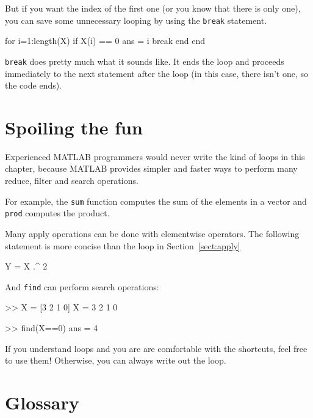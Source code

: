 \documentclass[
]{book}
\numberwithin{Answer}{chapter}
\numberwithin{Exercise}{chapter}
\begin{document}
But if you want the index of the first one (or you know that there
is only one), you can save some unnecessary looping by using the
{\tt break} statement.


\begin{code}
for i=1:length(X)
    if X(i) == 0
        ans = i
        break
    end
end
\end{code}

{\tt break} does pretty much what it sounds like.  It ends the
loop and proceeds immediately to the next statement after the
loop (in this case, there isn't one, so the code ends).


\section{Spoiling the fun}

Experienced MATLAB programmers would never write the kind of loops
in this chapter, because MATLAB provides simpler and faster ways to
perform many reduce, filter and search operations.

For example, the {\tt sum} function computes the sum of the elements
in a vector and {\tt prod} computes the product.

Many apply operations can be done with elementwise operators.
The following statement is more concise than the loop in
Section~\ref{sect:apply}

\begin{code}
Y = X .^ 2
\end{code}

And {\tt find} can perform search operations:

\begin{code}
>> X = [3 2 1 0]
X = 3     2     1     0

>> find(X==0)
ans = 4
\end{code}

If you understand loops and you are are comfortable with the
shortcuts, feel free to use them!  Otherwise, you can always write
out the loop.




\section{Glossary}
\end{document}

